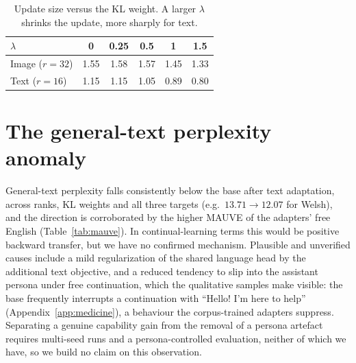 \documentclass{article}
\begin{document}
\begin{table}[h]\centering\small
\caption{Update size versus the KL weight. A larger $\lambda$ shrinks the update,
more sharply for text.}
\label{tab:dw-kl}
\begin{tabular}{lccccc}
\toprule
$\lambda$ & 0 & 0.25 & 0.5 & 1 & 1.5 \\
\midrule
Image ($r{=}32$) & 1.55 & 1.58 & 1.57 & 1.45 & 1.33 \\
Text ($r{=}16$)  & 1.15 & 1.15 & 1.05 & 0.89 & 0.80 \\
\bottomrule
\end{tabular}
\end{table}

\section{The general-text perplexity anomaly}
\label{app:anomaly}
General-text perplexity falls consistently below the base after text adaptation,
across ranks, KL weights and all three targets (e.g.\ $13.71\to12.07$ for Welsh),
and the direction is corroborated by the higher MAUVE of the adapters' free
English (Table~\ref{tab:mauve}). In continual-learning terms this would be
positive backward transfer, but we have no confirmed mechanism. Plausible and
unverified causes include a mild regularization of the shared language head by
the additional text objective, and a reduced tendency to slip into the assistant
persona under free continuation, which the qualitative samples make visible: the
base frequently interrupts a continuation with ``Hello! I'm here to help''
(Appendix~\ref{app:medicine}), a behaviour the corpus-trained adapters suppress.
Separating a genuine capability gain from the removal of a persona artefact
requires multi-seed runs and a persona-controlled evaluation, neither of which we
have, so we build no claim on this observation.
\end{document}
